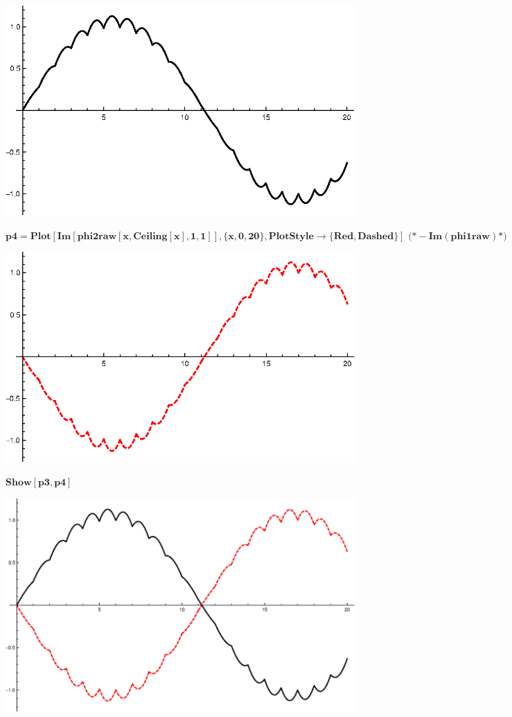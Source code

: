 {\includegraphics{chapters/appendices/KP_Mathematica/Kronig_Penney_model_transfer_matrix_gr25.eps}

\begin{doublespace}
\noindent\(\pmb{\text{p4}=\text{Plot}[\text{Im}[\text{phi2raw}[x,\text{Ceiling}[x],1,1]],\{x,0,20\},\text{PlotStyle}\to \{\text{Red},\text{Dashed}\}]\text{
 }\text{(*} -\text{Im}(\text{phi1raw}) \text{*)}}\)
\end{doublespace}

\includegraphics{chapters/appendices/KP_Mathematica/Kronig_Penney_model_transfer_matrix_gr26.eps}

\begin{doublespace}
\noindent\(\pmb{\text{Show}[\text{p3},\text{p4}]}\)
\end{doublespace}

\includegraphics[width=\textwidth]{chapters/appendices/KP_Mathematica/Kronig_Penney_model_transfer_matrix_gr27.eps}

}
